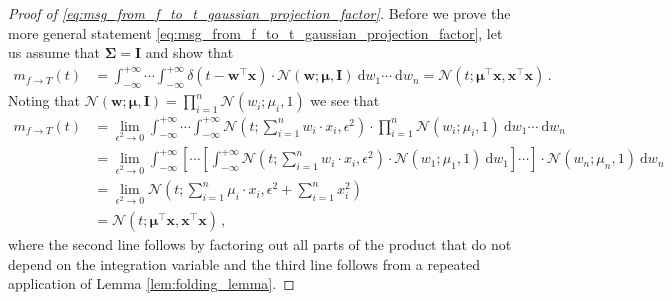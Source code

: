 \documentclass[a4paper]{article}
\newcommand{\Normal}[3]{{\mathcal N} \left({#1};{#2},{#3}\right)}
\newcommand{\bs}[1]{{\boldsymbol{#1}}}
\newcommand{\dirac}[1]{{\delta \left( {#1} \right)}}
\newcommand{\intd}[1]{\ \mathrm{d}{#1}}
\newcommand{\transpose}[1]{{#1}^\top}
\theoremstyle{definition}
\begin{document}
\begin{proof}[Proof of \eqref{eq:msg_from_f_to_t_gaussian_projection_factor}]
    Before we prove the more general statement \eqref{eq:msg_from_f_to_t_gaussian_projection_factor}, let us assume that $\bs{\Sigma} = \mathbf{I}$ and show that 
    \begin{align}
        m_{f\rightarrow T} (t)
         & = \int_{-\infty}^{+\infty} \cdots \int_{-\infty}^{+\infty} \dirac{t - \transpose{\bs{w}}\bs{x}} \cdot \Normal{\bs{w}}{\bs{\mu}}{\mathbf{I}} \intd{w_1} \cdots \intd{w_n} = \Normal{t}{\transpose{\bs{\mu}}\bs{x}}{\transpose{\bs{x}}\bs{x}} \,. \label{eq:axis_aligned_integral}
    \end{align}
    Noting that $\Normal{\bs{w}}{\bs{\mu}}{\mathbf{I}} = \prod_{i=1}^n \Normal{w_i}{\mu_i}{1}$ we see that 
    \begin{align*}
        m_{f\rightarrow T} (t)
         & = \lim_{\epsilon^2 \to 0} \int_{-\infty}^{+\infty} \cdots \int_{-\infty}^{+\infty} \Normal{t}{\sum_{i=1}^n w_i \cdot x_i}{\epsilon^2}\cdot \prod_{i=1}^n \Normal{w_i}{\mu_i}{1} \intd{w_1} \cdots \intd{w_n} \\
         & = \lim_{\epsilon^2 \to 0} \int_{-\infty}^{+\infty} \left[ \cdots \left[ \int_{-\infty}^{+\infty} \Normal{t}{\sum_{i=1}^n w_i \cdot x_i}{\epsilon^2} \cdot \Normal{w_1}{\mu_1}{1} \intd{w_1} \right] \cdots \right] \cdot \Normal{w_n}{\mu_n}{1} \intd{w_n} \\
         & = \lim_{\epsilon^2 \to 0} \Normal{t}{\sum_{i=1}^n \mu_i \cdot x_i}{\epsilon^2 + \sum_{i=1}^n x_i^2} \\
         & = \Normal{t}{\transpose{\bs{\mu}}\bs{x}}{\transpose{\bs{x}}\bs{x}} \,,
    \end{align*}
    where the second line follows by factoring out all parts of the product that do not depend on the integration variable and the third line follows from a repeated application of Lemma \ref{lem:folding_lemma}. 


\end{proof}
\end{document}
